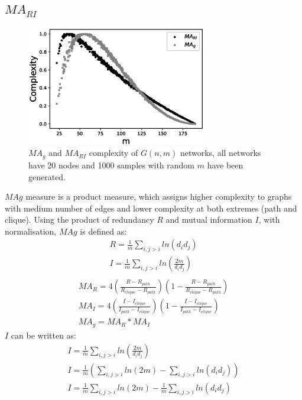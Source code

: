 \documentclass[12pt]{article}
\begin{document}
\subsection{$MA_{RI}$}
\begin{figure}[!thp]
    \centering
    \includegraphics[width=0.7\textwidth]{mariandmag.eps}
    \caption{$MA_g$ and $MA_{RI}$ complexity of $G(n,m)$ networks, all networks have 20 nodes and 1000 samples with random $m$ have been generated.}
    \label{fig:marimagcompare}
\end{figure}
\par
$MAg$ measure is a product measure, which assigns higher complexity to graphs with medium number of edges and lower complexity at both extremes (path and clique). Using the product of redundancy $R$ and mutual information $I$, with normalisation, $MAg$ is defined as\cite{KIM20082637}:
\begin{equation}
    \label{eq:RandI}
    \begin{gathered}
        R = \frac{1}{m}\sum_{i,j>i}ln(d_id_j)\\
        I = \frac{1}{m}\sum_{i,j>i}ln(\frac{2m}{d_id_j})\\
    \end{gathered}
\end{equation}
\begin{equation}
    \label{eq:mag}
    \begin{gathered}
        MA_R = 4(\frac{R-R_{path}}{R_{clique}-R_{path}})(1-\frac{R-R_{path}}{R_{clique}-R_{path}})\\
        MA_I = 4(\frac{I-I_{clique}}{I_{path}-I_{clique}})(1-\frac{I-I_{clique}}{I_{path}-I_{clique}})\\
        MA_g = MA_R * MA_I
    \end{gathered}
\end{equation}
$I$ can be written as:
\begin{equation}
    \begin{gathered}
        \label{eq:rewriteI}
        I = \frac{1}{m}\sum_{i,j>i}ln(\frac{2m}{d_id_j})\\
        I = \frac{1}{m}(\sum_{i,j>i}ln(2m)-\sum_{i,j>i}ln(d_id_j))\\
        I = \frac{1}{m}\sum_{i,j>i}ln(2m)-\frac{1}{m}\sum_{i,j>i}ln(d_id_j)\\
    \end{gathered}
\end{equation}
\end{document}
